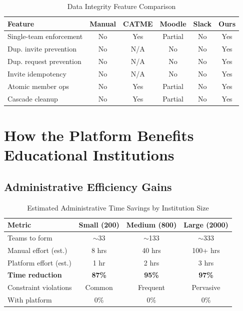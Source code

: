 \documentclass[12pt,a4paper]{article}
\begin{document}
\begin{table}[H]
\centering
\caption{Data Integrity Feature Comparison}
\begin{tabular}{@{}p{3cm}ccccc@{}}
\toprule
\textbf{Feature} & \textbf{Manual} & \textbf{CATME} & \textbf{Moodle} & \textbf{Slack} & \textbf{Ours} \\
\midrule
Single-team enforcement & No & Yes & Partial & No & Yes \\
Dup. invite prevention & No & N/A & No & No & Yes \\
Dup. request prevention & No & N/A & No & No & Yes \\
Invite idempotency & No & N/A & No & No & Yes \\
Atomic member ops & No & Yes & Partial & No & Yes \\
Cascade cleanup & No & Yes & Partial & No & Yes \\
\bottomrule
\end{tabular}
\end{table}

\section{How the Platform Benefits Educational Institutions}

\subsection{Administrative Efficiency Gains}

\begin{table}[H]
\centering
\caption{Estimated Administrative Time Savings by Institution Size}
\begin{tabular}{@{}lccc@{}}
\toprule
\textbf{Metric} & \textbf{Small (200)} & \textbf{Medium (800)} & \textbf{Large (2000)} \\
\midrule
Teams to form & $\sim$33 & $\sim$133 & $\sim$333 \\
Manual effort (est.) & 8 hrs & 40 hrs & 100+ hrs \\
Platform effort (est.) & 1 hr & 2 hrs & 3 hrs \\
\textbf{Time reduction} & \textbf{87\%} & \textbf{95\%} & \textbf{97\%} \\
Constraint violations & Common & Frequent & Pervasive \\
With platform & 0\% & 0\% & 0\% \\
\bottomrule
\end{tabular}
\end{table}
\end{document}
